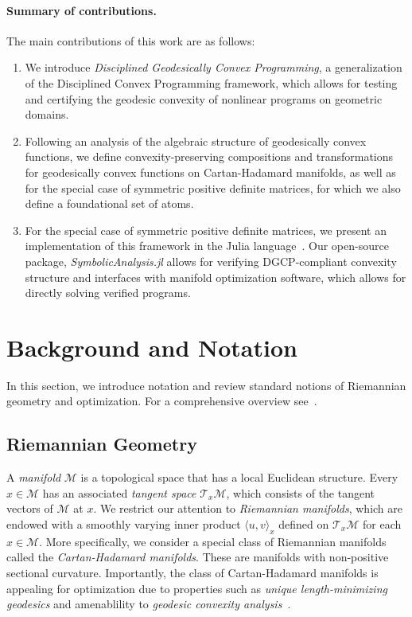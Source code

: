 \documentclass[twoside,11pt]{article}
\begin{document}
\paragraph{Summary of contributions.}
The main contributions of this work are as follows:
\begin{enumerate}
    \item We introduce \emph{Disciplined Geodesically Convex Programming}, a generalization of the Disciplined Convex Programming framework, which allows for testing and certifying the geodesic convexity of nonlinear programs on geometric domains.
    \item Following an analysis of the algebraic structure of geodesically convex functions, we define convexity-preserving compositions and transformations for geodesically convex functions on Cartan-Hadamard manifolds, as well as for the special case of symmetric positive definite matrices, for which we also define a foundational set of atoms.
    \item For the special case of symmetric positive definite matrices, we present an implementation of this framework in the Julia language~\citep{bezanson2017julia}. Our open-source package, \textsl{SymbolicAnalysis.jl} allows for verifying DGCP-compliant convexity structure and interfaces with manifold optimization software, which allows for directly solving verified programs.
\end{enumerate}


\section{Background and Notation}
In this section, we introduce notation and review standard notions of Riemannian geometry and optimization. For a comprehensive overview see~\citep{boumal2020introduction,bacak2014convex}.

\subsection{Riemannian Geometry}\label{sec:Riemannian_Geometry}
A \textit{manifold} $\mathcal{M}$ is a topological space that has a local Euclidean structure. Every $x \in \mathcal{M}$ has an associated \textit{tangent space} $\mathcal{T}_x \mathcal{M}$, which consists of the tangent vectors of $\mathcal{M}$ at $x$. We restrict our attention to \textit{Riemannian manifolds}, which are endowed with a smoothly varying inner product $\langle u, v \rangle_x$ defined on $\mathcal{T}_x \mathcal{M}$ for each $x \in \mathcal{M}$. More specifically, we consider a special class of Riemannian manifolds called the \emph{Cartan-Hadamard manifolds}. These are manifolds with non-positive sectional curvature. Importantly, the class of Cartan-Hadamard manifolds is appealing for optimization due to properties such as \textit{unique length-minimizing geodesics} and amenablility to \textit{geodesic convexity analysis}~\citep{bacak2014convex}. 
\end{document}
